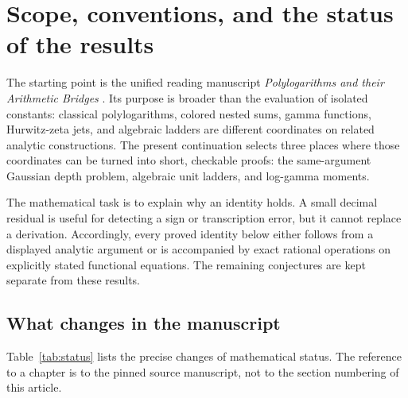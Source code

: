 \section{Scope, conventions, and the status of the results}
\label{sec:scope}

The starting point is the unified reading manuscript
\emph{Polylogarithms and their Arithmetic Bridges} \cite{manuscript}.
Its purpose is broader than the evaluation of isolated constants:
classical polylogarithms, colored nested sums, gamma functions,
Hurwitz-zeta jets, and algebraic ladders are different coordinates on
related analytic constructions. The present continuation selects three
places where those coordinates can be turned into short, checkable
proofs: the same-argument Gaussian depth problem, algebraic unit ladders,
and log-gamma moments.

The mathematical task is to explain why an identity holds. A small
decimal residual is useful for detecting a sign or transcription error,
but it cannot replace a derivation. Accordingly, every proved identity
below either follows from a displayed analytic argument or is accompanied
by exact rational operations on explicitly stated functional equations.
The remaining conjectures are kept separate from these results.

\subsection{What changes in the manuscript}

Table~\ref{tab:status} lists the precise changes of mathematical status.
The reference to a chapter is to the pinned source manuscript, not to
the section numbering of this article.

